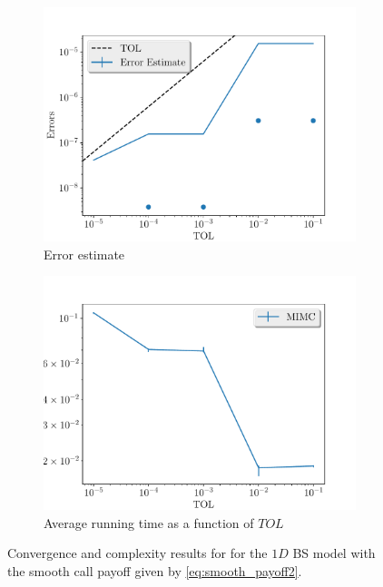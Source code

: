 \documentclass[11pt]{article}
\begin{document}
\begin{figure}[!h]
	\centering
	\begin{subfigure}{.5\textwidth}
		\centering
		\includegraphics[width=1\linewidth]{./figures/1D_BS_4_steps_smooth_second_payoff_eps_10_5/error_estimate.pdf}
		\caption{Error estimate}
		\label{fig:misc_1D_BS_4_steps_smooth_second_payoff_eps_10_5_sub1}
	\end{subfigure}%
	\begin{subfigure}{.5\textwidth}
		\centering
		\includegraphics[width=1\linewidth]{./figures/1D_BS_4_steps_smooth_second_payoff_eps_10_5/average_running_time.pdf}
		\caption{Average running time as a function of $TOL$}
		\label{fig:misc_1D_BS_4_steps_smooth_second_payoff_eps_10_5_sub2}
	\end{subfigure}%
	\caption{Convergence and complexity results for for the $1D$ BS model with the smooth call payoff given by \eqref{eq:smooth_payoff2}.}
	\label{fig:misc_1D_BS_4_steps_smooth_second_payoff_eps_10_5_1}
\end{figure}
\end{document}
